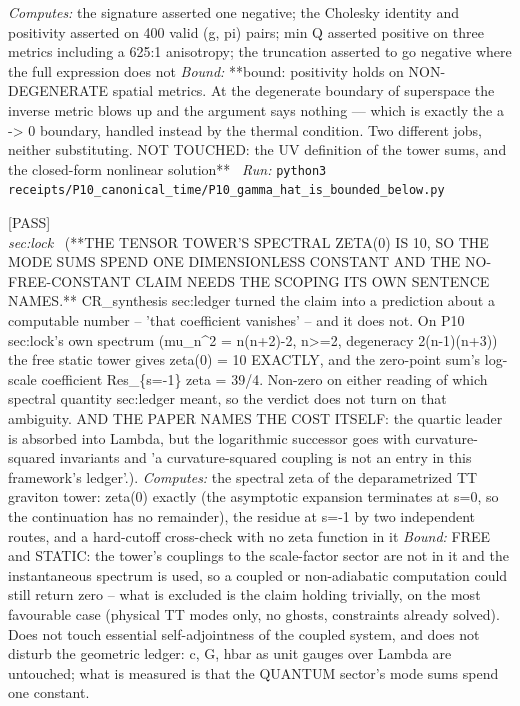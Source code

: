 \begin{description}
\emph{Computes:} the signature asserted one negative; the Cholesky identity and positivity asserted on 400 valid (g, pi) pairs; min Q asserted positive on three metrics including a 625:1 anisotropy; the truncation asserted to go negative where the full expression does not
 \emph{Bound:} **bound: positivity holds on NON-DEGENERATE spatial metrics. At the degenerate boundary of superspace the inverse metric blows up and the argument says nothing --- which is exactly the a -> 0 boundary, handled instead by the thermal condition. Two different jobs, neither substituting. NOT TOUCHED: the UV definition of the tower sums, and the closed-form nonlinear solution**
\ \emph{Run:} \texttt{python3 receipts/P10\_canonical\_time/P10\_gamma\_hat\_is\_bounded\_below.py}
\item[\rcptlabel{P10_the_towers_zeta_at_zero_is_ten_and_the_claim_needs_its_scoping}{P10R16}\textbf{P10R16}\quad\texttt{P10\_the\_towers\_zeta\_at\_zero\_is\_ten\_and\_the\_claim\_needs\_its\_scoping}]\hfill\textsf{[PASS]}\\
\textit{sec:lock} \ (**THE TENSOR TOWER'S SPECTRAL ZETA(0) IS 10, SO THE MODE SUMS SPEND ONE DIMENSIONLESS CONSTANT AND THE NO-FREE-CONSTANT CLAIM NEEDS THE SCOPING ITS OWN SENTENCE NAMES.** CR\_synthesis sec:ledger turned the claim into a prediction about a computable number -- 'that coefficient vanishes' -- and it does not. On P10 sec:lock's own spectrum (mu\_n\textasciicircum{}2 = n(n+2)-2, n>=2, degeneracy 2(n-1)(n+3)) the free static tower gives zeta(0) = 10 EXACTLY, and the zero-point sum's log-scale coefficient Res\_\{s=-1\} zeta = 39/4. Non-zero on either reading of which spectral quantity sec:ledger meant, so the verdict does not turn on that ambiguity. AND THE PAPER NAMES THE COST ITSELF: the quartic leader is absorbed into Lambda, but the logarithmic successor goes with curvature-squared invariants and 'a curvature-squared coupling is not an entry in this framework's ledger'.). 
\emph{Computes:} the spectral zeta of the deparametrized TT graviton tower: zeta(0) exactly (the asymptotic expansion terminates at s=0, so the continuation has no remainder), the residue at s=-1 by two independent routes, and a hard-cutoff cross-check with no zeta function in it
 \emph{Bound:} FREE and STATIC: the tower's couplings to the scale-factor sector are not in it and the instantaneous spectrum is used, so a coupled or non-adiabatic computation could still return zero -- what is excluded is the claim holding trivially, on the most favourable case (physical TT modes only, no ghosts, constraints already solved). Does not touch essential self-adjointness of the coupled system, and does not disturb the geometric ledger: c, G, hbar as unit gauges over Lambda are untouched; what is measured is that the QUANTUM sector's mode sums spend one constant.

\end{description}
